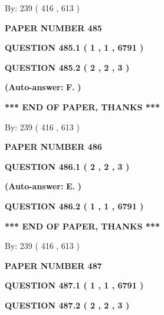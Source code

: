 \documentclass[12pt]{article}
\begin{document}
   
\hspace{1.0in} By: 
 239 ( 416 ,  613 )
   
   
   
   
\newpage 
\setcounter{page}{ 
   485001 } 
   
   
 {\textbf{ \Large{ PAPER NUMBER  485  }}}
   
   
   
   
  
  
{\textbf{\large{QUESTION
485.1 
 ( 1 , 1 , 6791 )
}}}
  
  
{\textbf{\large{QUESTION
485.2 
 ( 2 , 2 , 3 )
}}}
 
 
{\textbf{(Auto-answer:}}
{\textbf{\large{
F.}}}
{\textbf{)}}
 
 
   
   
   
   
\vspace{1.0in} 
{\textbf{\large{ *** END OF PAPER, THANKS *** }}} 
   
   
\hspace{1.0in} By: 
 239 ( 416 ,  613 )
   
   
   
   
\newpage 
\setcounter{page}{ 
   486001 } 
   
   
 {\textbf{ \Large{ PAPER NUMBER  486  }}}
   
   
   
   
  
  
{\textbf{\large{QUESTION
486.1 
 ( 2 , 2 , 3 )
}}}
 
 
{\textbf{(Auto-answer:}}
{\textbf{\large{
E.}}}
{\textbf{)}}
 
 
  
  
{\textbf{\large{QUESTION
486.2 
 ( 1 , 1 , 6791 )
}}}
   
   
   
   
\vspace{1.0in} 
{\textbf{\large{ *** END OF PAPER, THANKS *** }}} 
   
   
\hspace{1.0in} By: 
 239 ( 416 ,  613 )
   
   
   
   
\newpage 
\setcounter{page}{ 
   487001 } 
   
   
 {\textbf{ \Large{ PAPER NUMBER  487  }}}
   
   
   
   
  
  
{\textbf{\large{QUESTION
487.1 
 ( 1 , 1 , 6791 )
}}}
  
  
{\textbf{\large{QUESTION
487.2 
 ( 2 , 2 , 3 )
}}}
 
\end{document}
